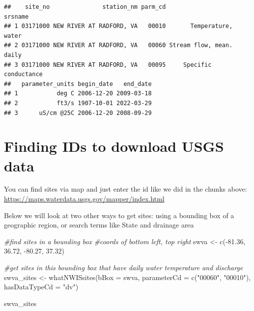 \documentclass[
]{book}
\newenvironment{Shaded}{\begin{snugshade}}{\end{snugshade}}
\newcommand{\AttributeTok}[1]{\textcolor[rgb]{0.77,0.63,0.00}{#1}}
\newcommand{\CommentTok}[1]{\textcolor[rgb]{0.56,0.35,0.01}{\textit{#1}}}
\newcommand{\FloatTok}[1]{\textcolor[rgb]{0.00,0.00,0.81}{#1}}
\newcommand{\FunctionTok}[1]{\textcolor[rgb]{0.00,0.00,0.00}{#1}}
\newcommand{\NormalTok}[1]{#1}
\newcommand{\OtherTok}[1]{\textcolor[rgb]{0.56,0.35,0.01}{#1}}
\newcommand{\SpecialCharTok}[1]{\textcolor[rgb]{0.00,0.00,0.00}{#1}}
\newcommand{\StringTok}[1]{\textcolor[rgb]{0.31,0.60,0.02}{#1}}
\begin{document}
\begin{verbatim}
##    site_no               station_nm parm_cd                  srsname
## 1 03171000 NEW RIVER AT RADFORD, VA   00010       Temperature, water
## 2 03171000 NEW RIVER AT RADFORD, VA   00060 Stream flow, mean. daily
## 3 03171000 NEW RIVER AT RADFORD, VA   00095     Specific conductance
##   parameter_units begin_date   end_date
## 1           deg C 2006-12-20 2009-03-18
## 2           ft3/s 1907-10-01 2022-03-29
## 3      uS/cm @25C 2006-12-20 2008-09-29
\end{verbatim}

\hypertarget{finding-ids-to-download-usgs-data}{%
\section{Finding IDs to download USGS data}\label{finding-ids-to-download-usgs-data}}

You can find sites via map and just enter the id like we did in the chunks above: \url{https://maps.waterdata.usgs.gov/mapper/index.html}

Below we will look at two other ways to get sites: using a bounding box of a geographic region, or search terms like State and drainage area

\begin{Shaded}
\begin{Highlighting}[]
\CommentTok{\#find sites in a bounding box}
\CommentTok{\#coords of bottom left, top right}
\NormalTok{swva }\OtherTok{\textless{}{-}} \FunctionTok{c}\NormalTok{(}\SpecialCharTok{{-}}\FloatTok{81.36}\NormalTok{, }\FloatTok{36.72}\NormalTok{, }\SpecialCharTok{{-}}\FloatTok{80.27}\NormalTok{, }\FloatTok{37.32}\NormalTok{)}

\CommentTok{\#get sites in this bounding box that have daily water temperature and discharge}
\NormalTok{swva\_sites }\OtherTok{\textless{}{-}} \FunctionTok{whatNWISsites}\NormalTok{(}\AttributeTok{bBox =}\NormalTok{ swva, }
                            \AttributeTok{parameterCd =} \FunctionTok{c}\NormalTok{(}\StringTok{"00060"}\NormalTok{, }\StringTok{"00010"}\NormalTok{), }
                            \AttributeTok{hasDataTypeCd =} \StringTok{"dv"}\NormalTok{)}

\NormalTok{swva\_sites}
\end{Highlighting}
\end{Shaded}
\end{document}
